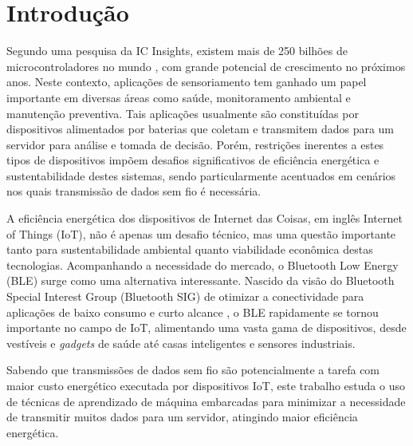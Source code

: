 \documentclass[a5paper]{ufsc-thesis}  %
\begin{document}
\renewcommand*\listfigurename{Lista de figuras}
\pdfbookmark[0]{\listfigurename}{lof}
\listoffigures*
\cleardoublepage

\listoftables*
\cleardoublepage

\tableofcontents*
\cleardoublepage


\textual

\chapter{Introdução}

Segundo uma pesquisa da IC Insights, existem mais de 250 bilhões de microcontroladores no mundo \cite{ic_insights}, com grande potencial de crescimento no próximos anos. Neste contexto, aplicações de sensoriamento tem ganhado um papel importante em diversas áreas como saúde, monitoramento ambiental e manutenção preventiva. Tais aplicações usualmente são constituídas por dispositivos alimentados por baterias que coletam e transmitem dados para um servidor para análise e tomada de decisão. Porém, restrições inerentes a estes tipos de dispositivos impõem desafios significativos de eficiência energética e sustentabilidade destes sistemas, sendo particularmente acentuados em cenários nos quais transmissão de dados sem fio é necessária.

A eficiência energética dos dispositivos de Internet das Coisas, em inglês Internet of Things (IoT), não é apenas um desafio técnico, mas uma questão importante tanto para sustentabilidade ambiental quanto viabilidade econômica destas tecnologias. Acompanhando a necessidade do mercado, o Bluetooth Low Energy (BLE) surge como uma alternativa interessante. Nascido da visão do Bluetooth Special Interest Group (Bluetooth SIG) de otimizar a conectividade para aplicações de baixo consumo e curto alcance \cite{Townsend_2014}, o BLE rapidamente se tornou importante no campo de IoT, alimentando uma vasta gama de dispositivos, desde vestíveis e \textit{gadgets} de saúde até casas inteligentes e sensores industriais.

Sabendo que transmissões de dados sem fio são potencialmente a tarefa com maior custo energético executada por dispositivos IoT, este trabalho estuda o uso de técnicas de aprendizado de máquina embarcadas para minimizar a necessidade de transmitir muitos dados para um servidor, atingindo maior eficiência energética.
\end{document}
